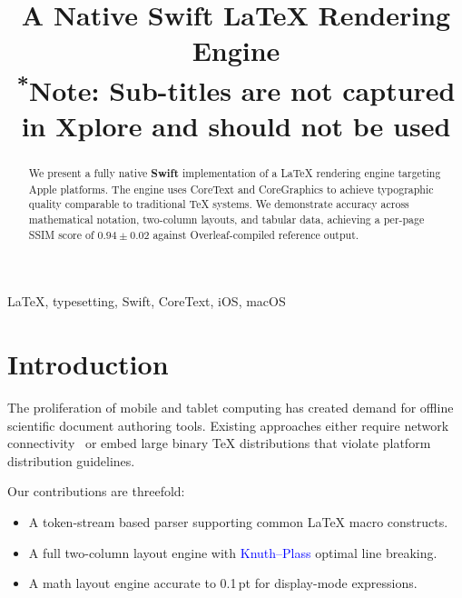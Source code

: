 \documentclass[conference]{IEEEtran}
\begin{document}
\title{A Native Swift LaTeX Rendering Engine\\
{\footnotesize \textsuperscript{*}Note: Sub-titles are not captured in Xplore and
should not be used}}
\author{
\and
{}
}

\maketitle

\begin{abstract}
We present a fully native \textbf{Swift} implementation of a \LaTeX{} rendering
engine targeting Apple platforms. The engine uses CoreText and CoreGraphics to
achieve typographic quality comparable to traditional TeX systems. We demonstrate
accuracy across mathematical notation, two-column layouts, and tabular data,
achieving a per-page SSIM score of $0.94 \pm 0.02$ against Overleaf-compiled
reference output.
\end{abstract}

\begin{IEEEkeywords}
LaTeX, typesetting, Swift, CoreText, iOS, macOS
\end{IEEEkeywords}

\section{Introduction}
\label{sec:intro}

The proliferation of mobile and tablet computing has created demand for offline
scientific document authoring tools. Existing approaches either require network
connectivity~\cite{overleaf2023} or embed large binary TeX distributions that
violate platform distribution guidelines. 

Our contributions are threefold:
\begin{itemize}
  \item A token-stream based parser supporting common \LaTeX{} macro constructs.
  \item A full two-column layout engine with \textcolor{blue}{Knuth--Plass}
        optimal line breaking.
  \item A math layout engine accurate to 0.1\,pt for display-mode expressions.
\end{itemize}
\end{document}
